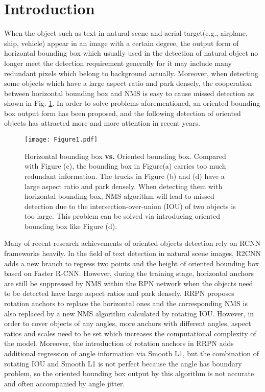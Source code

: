 \documentclass[runningheads]{llncs}
\begin{document}
\section{Introduction}




When the object such as text in natural scene and aerial target(e.g., airplane, ship, vehicle) appear in an image with a certain degree, the output form of horizontal bounding box which usually used in the detection of natural object no longer meet the detection requirement generally for it may include many redundant pixels which belong to background actually. Moreover, when detecting some objects which have a large aspect ratio and park densely, the cooperation between horizontal bounding box and NMS is easy to cause missed detection as shown in Fig. \ref{Figure 1}. In order to solve problems aforementioned, an oriented bounding box output form has been proposed, and the following detection of oriented objects has attracted more and more attention in recent years.
\begin{figure*}[t]
	\centering
	\texttt{[image: Figure1.pdf]}
\caption{Horizontal bounding box \textbf{vs.} Oriented bounding box. Compared with Figure (c), the bounding box in Figure(a) carries too much redundant information. The trucks in Figure (b) and (d) have a large aspect ratio and park densely. When detecting them with horizontal bounding box, NMS algorithm will lead to missed detection due to the intersection-over-union (IOU) of two objects is too large. This problem can be solved via introducing oriented bounding box like Figure (d).}
	\label{Figure 1}
\end{figure*}


Many of recent research achievements of oriented objects detection rely on RCNN frameworks heavily. In the field of text detection in natural scene images, R2CNN\cite{jiang2017r2cnn} adds a new branch to regress two points and the height of oriented bounding box based on Faster R-CNN\cite{ren2015faster}. However, during the training stage, horizontal anchors are still be suppressed by NMS within the RPN network when the objects need to be detected have large aspect ratios and park densely. RRPN\cite{ma2018arbitrary} proposes rotation anchors to replace the horizontal ones and the corresponding NMS is also replaced by a new NMS algorithm calculated by rotating IOU. However, in order to cover objects of any angles, more anchors with different angles, aspect ratios and scales need to be set which increases the computational complexity of the model. Moreover, the introduction of rotation anchors in RRPN adds additional regression of angle information via Smooth L1\cite{girshick2015fast}, but the combination of rotating IOU and Smooth L1 is not perfect because the angle has boundary problem, so the oriented bounding box output by this algorithm is not accurate and often accompanied by angle jitter. 
\end{document}
